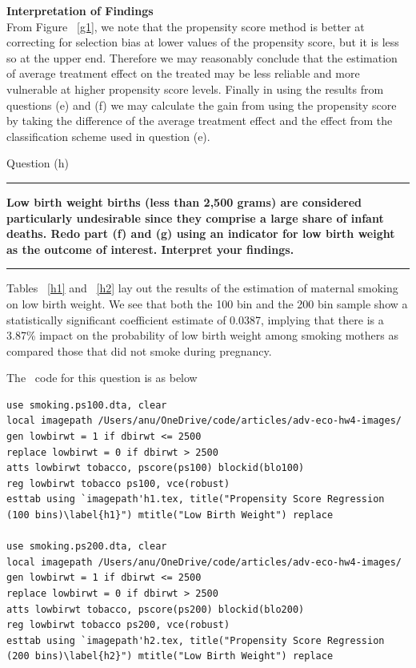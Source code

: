 \documentclass[12pt]{article}
\newcommand\question[1]{\vspace{1em}\hrule\vspace{1em}\textbf{#1}\vspace{1em}\hrule\vspace{1em}}
\begin{document}
\textbf{Interpretation of Findings}\\
From Figure ~\ref{g1}, we note that the propensity score method is better at correcting for selection bias at lower values of the propensity score, but it is less so at the upper end. Therefore we may reasonably conclude that the estimation of average treatment effect on the treated may be less reliable and more vulnerable at higher propensity score levels. Finally in using the results from questions (e) and (f) we may calculate the gain from using the propensity score by taking the difference of the average treatment effect and the effect from the classification scheme used in question (e).

\newpage
\begin{center}\LARGE{Question (h)}\end{center}
\question{Low birth weight births (less than 2,500 grams) are considered particularly undesirable since they comprise a large share of infant deaths.  Redo part (f) and (g) using an indicator for low birth weight as the outcome of interest.  Interpret your findings.}




Tables ~\ref{h1} and ~\ref{h2} lay out the results of the estimation of maternal smoking on low birth weight. We see that both the 100 bin and the 200 bin sample show a statistically significant coefficient estimate of 0.0387, implying that there is a 3.87\% impact on the probability of low birth weight among smoking mothers as compared those that did not smoke during pregnancy.

The \stata \ code   for this question is as below
\begin{lstlisting}
use smoking.ps100.dta, clear
local imagepath /Users/anu/OneDrive/code/articles/adv-eco-hw4-images/
gen lowbirwt = 1 if dbirwt <= 2500
replace lowbirwt = 0 if dbirwt > 2500
atts lowbirwt tobacco, pscore(ps100) blockid(blo100)
reg lowbirwt tobacco ps100, vce(robust)
esttab using `imagepath'h1.tex, title("Propensity Score Regression (100 bins)\label{h1}") mtitle("Low Birth Weight") replace

use smoking.ps200.dta, clear
local imagepath /Users/anu/OneDrive/code/articles/adv-eco-hw4-images/
gen lowbirwt = 1 if dbirwt <= 2500
replace lowbirwt = 0 if dbirwt > 2500
atts lowbirwt tobacco, pscore(ps200) blockid(blo200)
reg lowbirwt tobacco ps200, vce(robust)
esttab using `imagepath'h2.tex, title("Propensity Score Regression (200 bins)\label{h2}") mtitle("Low Birth Weight") replace
\end{lstlisting}
\end{document}
